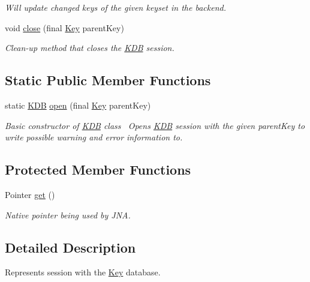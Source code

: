 \begin{DoxyCompactItemize}
\begin{DoxyCompactList}\small\item\em Will update changed keys of the given keyset in the backend. \end{DoxyCompactList}\item 
void \hyperlink{classorg_1_1libelektra_1_1KDB_af6b472eadf78ba4ed216303b52ddb29e}{close} (final \hyperlink{classorg_1_1libelektra_1_1Key}{Key} parent\+Key)
\begin{DoxyCompactList}\small\item\em Clean-\/up method that closes the \hyperlink{classorg_1_1libelektra_1_1KDB}{K\+DB} session. \end{DoxyCompactList}\end{DoxyCompactItemize}
\subsection*{Static Public Member Functions}
\begin{DoxyCompactItemize}
\item 
static \hyperlink{classorg_1_1libelektra_1_1KDB}{K\+DB} \hyperlink{classorg_1_1libelektra_1_1KDB_ae7e6c1cea2b930a077aec11c3cbdef4b}{open} (final \hyperlink{classorg_1_1libelektra_1_1Key}{Key} parent\+Key)
\begin{DoxyCompactList}\small\item\em Basic constructor of \hyperlink{classorg_1_1libelektra_1_1KDB}{K\+DB} class~\newline
 Opens \hyperlink{classorg_1_1libelektra_1_1KDB}{K\+DB} session with the given parent\+Key to write possible warning and error information to. \end{DoxyCompactList}\end{DoxyCompactItemize}
\subsection*{Protected Member Functions}
\begin{DoxyCompactItemize}
\item 
Pointer \hyperlink{classorg_1_1libelektra_1_1KDB_a600abc786bde91a3122bd96be991a3d5}{get} ()
\begin{DoxyCompactList}\small\item\em Native pointer being used by J\+NA. \end{DoxyCompactList}\end{DoxyCompactItemize}


\subsection{Detailed Description}
Represents session with the \hyperlink{classorg_1_1libelektra_1_1Key}{Key} database. 

